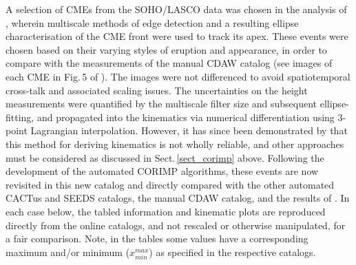 \documentclass[referee,a4paper,12pt,traditabstract]{swsc}
\begin{document}
\begin{linenumbers}
A selection of CMEs from the SOHO/LASCO data was chosen in the analysis of \cite{2009A&A...495..325B}, wherein multiscale methods of edge detection and a resulting ellipse characterisation of the CME front were used to track its apex. These events were chosen based on their varying styles of eruption and appearance, in order to compare with the measurements of the manual CDAW catalog (see images of each CME in Fig.\,5 of \citealt{2009A&A...495..325B}). The images were not differenced to avoid spatiotemporal cross-talk and associated scaling issues. The uncertainties on the height measurements were quantified by the multiscale filter size and subsequent ellipse-fitting, and propagated into the kinematics via numerical differentiation using 3-point Lagrangian interpolation. However, it has since been demonstrated by \cite{2013A&A...557A..96B} that this method for deriving kinematics is not wholly reliable, and other approaches must be considered as discussed in Sect.\,\ref{sect_corimp} above. Following the development of the automated CORIMP algorithms, these events are now revisited in this new catalog and directly compared with the other automated CACTus and SEEDS catalogs, the manual CDAW catalog, and the results of \cite{2009A&A...495..325B}. In each case below, the tabled information and kinematic plots are reproduced directly from the online catalogs, and not rescaled or otherwise manipulated, for a fair comparison. Note, in the tables some values have a corresponding maximum and/or minimum ($x_{min}^{max}$) as specified in the respective catalogs.




\end{linenumbers}
\end{document}
